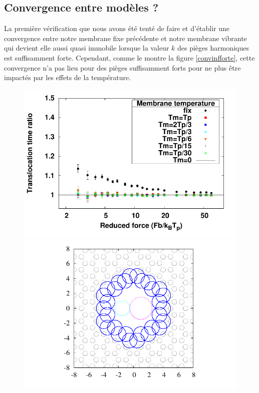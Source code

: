 \subsection{Convergence entre modèles ?}

La première vérification que nous avons été tenté de faire et d'établir une convergence entre notre membrane fixe précédente et notre membrane vibrante qui devient elle aussi quasi immobile lorsque la valeur $k$ des pièges harmoniques est suffisamment forte. Cependant, comme le montre la figure \ref{convinfforte}, cette convergence n'a pas lieu pour des pièges suffisamment forts pour ne plus être impactés par les effets de la température.


\begin{figure}[H]
\includegraphics[width=\textwidth]{compkkveryhightonotempkveryhighdifferenttemp.pdf}
\begin{minipage}{0.63\linewidth}
\includegraphics[width=\textwidth]{poreareahighk.pdf}

\end{minipage}
\end{figure}
